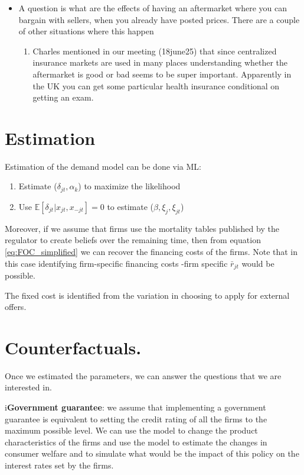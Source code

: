 \documentclass[12pt]{article}
\theoremstyle{plain}
\theoremstyle{plain}
\begin{document}
\begin{itemize}
    \item A question is what are the effects of having an aftermarket where you can bargain with sellers, when you already have posted prices. There are a couple of other situations where this happen 
    \begin{enumerate}
        \item Charles mentioned in our meeting (18june25) that since centralized insurance markets are used in many places understanding whether the aftermarket is good or bad seems to be super important. Apparently in the UK you can get some particular health insurance conditional on getting an exam.
    \end{enumerate}
    
\end{itemize}

\section{Estimation}
Estimation of the demand model can be done via ML: 
\begin{enumerate}
    \item Estimate  ($\delta_{jt}, \alpha_k$) to maximize the likelihood 
    \item Use $\mathbb{E}[\delta_{jt}|x_{jt},x_{-jt}]= 0$ to estimate ($\beta, \xi_j, \xi_{jt}$)
\end{enumerate}

Moreover, if we assume that firms use the mortality tables published by the regulator to create beliefs over the remaining time, then from equation \ref{eq:FOC_simplified} we can recover the financing costs of the firms. Note that in this case identifying firm-specific financing costs -firm specific $\bar{r}_{jt}$ would be possible. 

The fixed cost is identified from the variation in choosing to apply for external offers. 






\section{Counterfactuals.}

Once we estimated the parameters, we can answer the questions that we are interested in. 

i\textbf{Government guarantee}: we assume that implementing a government guarantee is equivalent to setting the credit rating of all the firms to the maximum possible level. We can use the model to change the product characteristics of the firms and use the model to estimate the changes in consumer welfare and to simulate what would be the impact of this policy on the interest rates set by the firms. 
\end{document}
